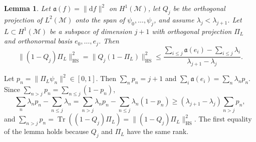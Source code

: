 \documentclass[11pt,a4paper]{article}
\makeatletter
\theoremstyle{stmt}
\newtheorem{lemma}[theorem]{Lemma}
\theoremstyle{defn}
\theoremstyle{rmk}
\renewenvironment{proof}[1][\proofname]{\par\pushQED{\qed}\normalfont\topsep6\p@\@plus6\p@\relax
  \trivlist\item[\hskip\labelsep{\sffamily\itshape\small #1.}]\ignorespaces}{\popQED\endtrivlist\@endpefalse}
\numberwithin{equation}{section}
\DeclareMathOperator{\Tr}{Tr}
\newcommand{\M}{\mathcal{M}}
\newcommand{\dd}{\mathrm{d}}
\makeatother
\begin{document}
\begin{lemma}\label{lem:kyfan}
Let $\mathfrak a(f)=\|\dd f\|^2$ on $H^1(\M)$, let $Q_j$ be the orthogonal projection of $L^2(\M)$ onto the span of $\psi_0,\dots,\psi_j$, and assume $\lambda_j<\lambda_{j+1}$. Let $L\subset H^1(\M)$ be a subspace of dimension $j+1$ with orthogonal projection $\Pi_L$ and orthonormal basis $e_0,\dots,e_j$. Then
\begin{equation}
\|(1-Q_j)\Pi_L\|_{\mathrm{HS}}^2=\|Q_j(1-\Pi_L)\|_{\mathrm{HS}}^2\le\frac{\sum_{i\le j}\mathfrak a(e_i)-\sum_{i\le j}\lambda_i}{\lambda_{j+1}-\lambda_j}.
\end{equation}
\end{lemma}

\begin{proof}
Let $p_n=\|\Pi_L\psi_n\|^2\in[0,1]$. Then $\sum_np_n=j+1$ and $\sum_i\mathfrak a(e_i)=\sum_n\lambda_np_n$. Since $\sum_{n>j}p_n=\sum_{n\le j}(1-p_n)$,
\[
\sum_n\lambda_np_n-\sum_{n\le j}\lambda_n=\sum_{n>j}\lambda_np_n-\sum_{n\le j}\lambda_n(1-p_n)\ge(\lambda_{j+1}-\lambda_j)\sum_{n>j}p_n ,
\]
and $\sum_{n>j}p_n=\Tr((1-Q_j)\Pi_L)=\|(1-Q_j)\Pi_L\|_{\mathrm{HS}}^2$. The first equality of the lemma holds because $Q_j$ and $\Pi_L$ have the same rank.
\end{proof}
\end{document}
